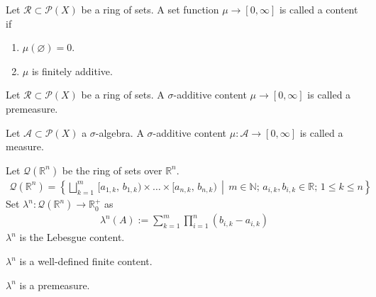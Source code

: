\begin{definition}[Content]
    Let \(\mathcal{R} \subset \mathcal{P}(X)\) be a ring of sets. A set function \(\mu \rightarrow [0, \infty]\) is called a content if
    \begin{enumerate}
        \item \(\mu(\varnothing) = 0\).
        \item \(\mu\) is finitely additive.
    \end{enumerate}
\end{definition}
%
\begin{definition}[Premeasure]
    Let \(\mathcal{R} \subset \mathcal{P}(X)\) be a ring of sets. A \(\sigma\)-additive content \(\mu \rightarrow [0, \infty]\) is called a premeasure.
\end{definition}
%
\begin{definition}[Measure]
    Let \(\mathcal{A} \subset \mathcal{P}(X)\) a \(\sigma\)-algebra. A \(\sigma\)-additive content \(\mu: \mathcal{A} \rightarrow [0, \infty]\) is called a measure.
\end{definition}
%
\begin{definition}
    Let \(\mathcal{Q}(\mathbb{R}^n)\) be the ring of sets over \(\mathbb{R}^n\). %
    \begin{align}
        \mathcal{Q}(\mathbb{R}^n) = \left\{ \bigsqcup_{k=1}^m \, [a_{1, k},\, b_{1, k}) \times \dots \times [a_{n, k},\, b_{n, k}) \, \middle| \, m \in \mathbb{N}; \, a_{i, k}, b_{i, k} \in \mathbb{R}; \, 1 \leq k \leq n \right\}
    \end{align}
    Set \(\lambda^n: \mathcal{Q}(\mathbb{R}^n) \rightarrow \mathbb{R}_0^+\) as
    \begin{align}
        \lambda^n(A) := \sum_{k=1}^m \prod_{i=1}^n (b_{i,k} - a_{i, k})
    \end{align}
    \(\lambda^n\) is the Lebesgue content.
\end{definition}
\begin{theorem}
    \(\lambda^n\) is a well-defined finite content.
\end{theorem}
\begin{theorem}
    \(\lambda^n\) is a premeasure.
\end{theorem}
